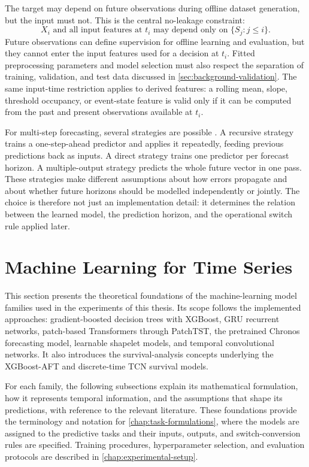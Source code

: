 The target may depend on future observations during offline dataset generation,
but the input must not. This is the central no-leakage constraint:
\[
  X_i \text{ and all input features at } t_i
  \text{ may depend only on } \{S_j : j \le i\}.
\]
Future observations can define supervision for offline learning and evaluation,
but they cannot enter the input features used for a decision at \(t_i\).
Fitted preprocessing parameters and model selection must also respect the
separation of training, validation, and test data discussed in
\cref{sec:background-validation}. The same input-time restriction applies to derived
features: a rolling mean, slope, threshold occupancy, or event-state feature is
valid only if it can be computed from the past and present observations
available at \(t_i\).

For multi-step forecasting, several strategies are possible
\cite{taieb2012review}. A recursive strategy trains a one-step-ahead predictor
and applies it repeatedly, feeding previous predictions back as inputs. A direct
strategy trains one predictor per forecast horizon. A multiple-output strategy
predicts the whole future vector in one pass. These strategies make different
assumptions about how errors propagate and about whether future horizons should
be modelled independently or jointly. The choice is therefore not just an
implementation detail: it determines the relation between the learned model, the
prediction horizon, and the operational switch rule applied later.

\section{Machine Learning for Time Series}
\label{sec:background-ml-time-series}

This section presents the theoretical foundations of the machine-learning model
families used in the experiments of this thesis. Its scope follows the
implemented approaches: gradient-boosted decision trees with XGBoost, GRU
recurrent networks, patch-based Transformers through PatchTST, the pretrained
Chronos forecasting model, learnable shapelet models, and temporal convolutional
networks. It also introduces the survival-analysis concepts underlying the
XGBoost-AFT and discrete-time TCN survival models.

For each family, the following subsections explain its mathematical formulation,
how it represents temporal information, and the assumptions that shape its
predictions, with reference to the relevant literature. These foundations
provide the terminology and notation for \cref{chap:task-formulations}, where
the models are assigned to the predictive tasks and their inputs, outputs, and
switch-conversion rules are specified. Training procedures, hyperparameter
selection, and evaluation protocols are described in
\cref{chap:experimental-setup}.

